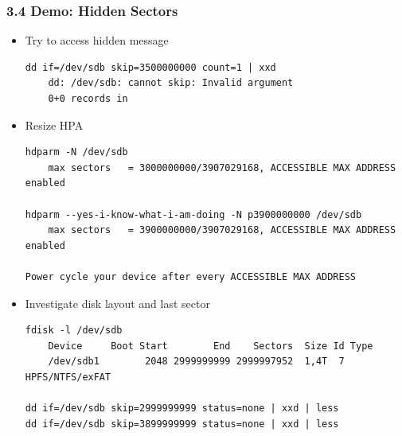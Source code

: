 \begin{frame}[fragile]
  \frametitle{3.4 Demo: Hidden Sectors}
    \begin{itemize}
        \item Try to access hidden message
\begin{lstlisting}[basicstyle=\tiny]
dd if=/dev/sdb skip=3500000000 count=1 | xxd
    dd: /dev/sdb: cannot skip: Invalid argument
    0+0 records in
\end{lstlisting}
        \item Resize HPA
\begin{lstlisting}[basicstyle=\tiny]
hdparm -N /dev/sdb
    max sectors   = 3000000000/3907029168, ACCESSIBLE MAX ADDRESS enabled

hdparm --yes-i-know-what-i-am-doing -N p3900000000 /dev/sdb
    max sectors   = 3900000000/3907029168, ACCESSIBLE MAX ADDRESS enabled

Power cycle your device after every ACCESSIBLE MAX ADDRESS
\end{lstlisting}
        \item Investigate disk layout and last sector
\begin{lstlisting}[basicstyle=\tiny]
fdisk -l /dev/sdb
    Device     Boot Start        End    Sectors  Size Id Type
    /dev/sdb1        2048 2999999999 2999997952  1,4T  7 HPFS/NTFS/exFAT

dd if=/dev/sdb skip=2999999999 status=none | xxd | less
dd if=/dev/sdb skip=3899999999 status=none | xxd | less
\end{lstlisting}
    \end{itemize}
\end{frame}


